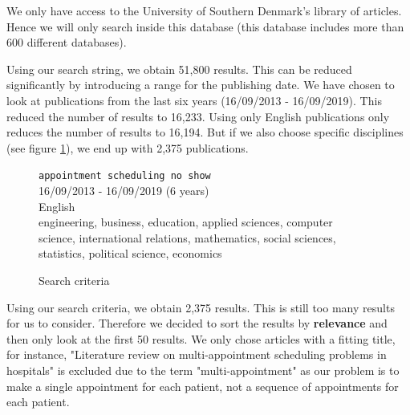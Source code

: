 \documentclass[a4paper,12pt]{article}
\begin{document}
\bigbreak

We only have access to the University of Southern Denmark's library of articles. Hence we will only search inside this database (this database includes more than 600 different databases).

\bigbreak

Using our search string, we obtain 51,800 results. This can be reduced significantly by introducing a range for the publishing date. We have chosen to look at publications from the last six years (16/09/2013 - 16/09/2019). This reduced the number of results to 16,233. Using only English publications only reduces the number of results to 16,194. But if we also choose specific disciplines (see figure \ref{search-criteria}), we end up with 2,375 publications.

\bigbreak

\begin{figure}[H]
    \begin{framed}
         \texttt{appointment scheduling no show} \\
         16/09/2013 - 16/09/2019 (6 years) \\
         English \\
         engineering, business, education, applied sciences, computer \\ \makebox[3.7cm][l]{} science, international relations, mathematics, social sciences, \\ \makebox[3.7cm][l]{} statistics, political science, economics
    \end{framed}
    \caption{Search criteria}
    \label{search-criteria}
\end{figure}

\bigbreak

Using our search criteria, we obtain 2,375 results. This is still too many results for us to consider. Therefore we decided to sort the results by \textbf{relevance} and then only look at the first 50 results. We only chose articles with a fitting title, for instance, "Literature review on multi-appointment scheduling problems in hospitals" is excluded due to the term "multi-appointment" as our problem is to make a single appointment for each patient, not a sequence of appointments for each patient.
\bigbreak
\end{document}
